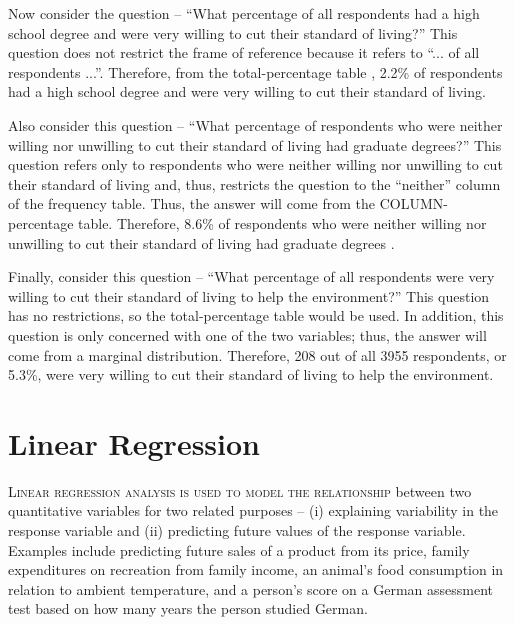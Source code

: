 \documentclass[10pt,openany]{book}\usepackage[]{graphicx}\usepackage[]{color}
\begin{document}
Now consider the question -- ``What percentage of all respondents had a high school degree and were very willing to cut their standard of living?''  This question does not restrict the frame of reference because it refers to ``... of all respondents ...''. Therefore, from the total-percentage table , 2.2\% of respondents had a high school degree and were very willing to cut their standard of living.

Also consider this question -- ``What percentage of respondents who were neither willing nor unwilling to cut their standard of living had graduate degrees?''  This question refers only to respondents who were neither willing nor unwilling to cut their standard of living and, thus, restricts the question to the ``neither'' column of the frequency table. Thus, the answer will come from the COLUMN-percentage table. Therefore, 8.6\% of respondents who were neither willing nor unwilling to cut their standard of living had graduate degrees .

Finally, consider this question -- ``What percentage of all respondents were very willing to cut their standard of living to help the environment?''  This question has no restrictions, so the total-percentage table would be used. In addition, this question is only concerned with one of the two variables; thus, the answer will come from a marginal distribution. Therefore, 208 out of all 3955 respondents, or 5.3\%, were very willing to cut their standard of living to help the environment.


\vspace{-12pt}



\chapter{Linear Regression}  \label{chap:Regress}

\minitoc
\vspace{48pt}

\lettrine{L}{inear regression analysis is used to model the relationship} between two quantitative variables for two related purposes -- (i) explaining variability in the response variable and (ii) predicting future values of the response variable. Examples include predicting future sales of a product from its price, family expenditures on recreation from family income, an animal's food consumption in relation to ambient temperature, and a person's score on a German assessment test based on how many years the person studied German.
\end{document}
